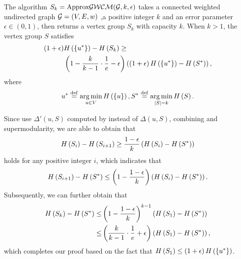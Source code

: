 \documentclass[10pt,twocolumn,twoside]{IEEEtran}
\begin{document}

\begin{theorem}
    The algorithm \(S_k=\text{Approx}\mathcal{GWCM}(\mathcal{G},k,\epsilon)\) takes a connected weighted undirected graph \(\mathcal{G}=(V,E,w)\) ,a positive integer \(k\) and an error parameter \(\epsilon\in(0,1)\), then returns a vertex group \(S_k\) with capacity \(k\). When \(k>1\), the vertex group \(S\) satisfies
    \begin{align*}
        \left( 1+\epsilon \right) & H\left(\left\{u^* \right\}\right)-H\left(S_k\right)\ge                                                                         \\
                           & \left( 1-\frac{k}{k-1}\cdot\frac{1}{e}-\epsilon \right)\left( \left( 1+\epsilon \right)H\left(\left\{u^* \right\}\right)-H\left(S^*\right) \right),
    \end{align*}
    where
    \[u^*\stackrel{\mathrm{def}}{=}\operatorname*{arg\,min}_{u\in V}H\left(\left\{u \right\}\right),S^*\stackrel{\mathrm{def}}{=}\operatorname*{arg\,min}_{\left|S \right|=k}H\left(S\right).\]
\end{theorem}
\begin{IEEEproof}
    Since  use \(\Delta'(u,S)\) computed by  instead of \(\Delta(u,S)\), combining  and supermodularity, we are able to obtain that
    \begin{equation*}
        H\left(S_i\right)-H\left(S_{i+1}\right)\ge\frac{1-\epsilon}{k}\left( H\left(S_i\right)-H\left(S^*\right) \right)
    \end{equation*}
    holds for any positive integer \(i\), which indicates that
    \begin{equation*}
        H\left(S_{i+1}\right)-H\left(S^*\right)\le\left( 1-\frac{1-\epsilon}{k} \right)\left( H\left(S_i\right)-H\left(S^*\right) \right).
    \end{equation*}
    Subsequently, we can further obtain that
    \begin{align*}
        H\left(S_k\right)-H\left(S^*\right) \le & \left( 1-\frac{1-\epsilon}{k} \right)^{k-1}\left( H\left(S_1\right)-H\left(S^*\right) \right)            \\
        \le                       & \left( \frac{k}{k-1}\cdot\frac{1}{e}+\epsilon \right)\left( H\left(S_1\right)-H\left(S^*\right) \right),
    \end{align*}
    which completes our proof based on the fact that \(H\left(S_1\right)\le\left( 1+\epsilon \right)H\left(\left\{u^* \right\}\right)\).
\end{IEEEproof}
\end{document}
